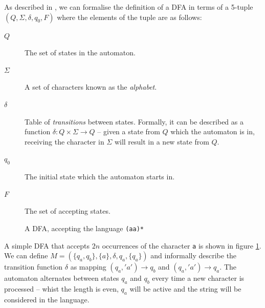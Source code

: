 \documentclass[a4paper,openany,12pt]{book}
\begin{document}
As described in \citet[p.~35]{sipser2012introduction}, we can formalise the definition of a DFA in terms of a 5-tuple
$(Q, \Sigma, \delta, q_0, F)$ where the elements of the tuple are as follows:

\begin{description}
    \item[$Q$] The set of states in the automaton.
    \item[$\Sigma$] A set of characters known as the \emph{alphabet}.
    \item[$\delta$] Table of \emph{transitions} between states.
                    Formally, it can be described as a function $\delta : Q \times \Sigma \rightarrow Q$ -- given a
                    state from $Q$ which the automaton is in, receiving the character in $\Sigma$ will result in a
                    new state from $Q$.
    \item[$q_0$] The initial state which the automaton starts in.
    \item[$F$] The set of accepting states.
\end{description}
    
\begin{figure}[H]
    \begin{MyMdframed}
        \vspace{0.5em}
        \caption{\label{figure:dfa:1} A DFA, accepting the language \texttt{(aa)*}}
        \vspace{0.5em}
        \captionsetup{style=default}


        \vspace{0.5em}
    \end{MyMdframed}
\end{figure}

A simple DFA that accepts $2n$ occurrences of the character \texttt{a} is shown in figure \ref{figure:dfa:1}.
We can define $M = (\{q_a,q_b\}, \{a\}, \delta, q_a, \{q_a\})$ and informally describe the transition function $\delta$
as mapping $(q_a, 'a') \rightarrow q_b$ and $(q_a, 'a') \rightarrow q_a$.
The automaton alternates between states $q_a$ and $q_b$ every time a new character is processed -- whist the length is
even, $q_a$ will be active and the string will be considered in the language.
\end{document}
